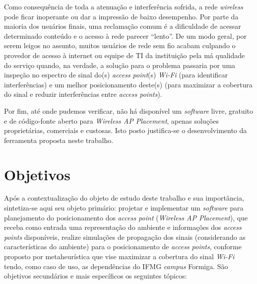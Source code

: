 \documentclass[
	12pt,				%
	twoside,			%
	a4paper,			%
	english,			%
	french,				%
	spanish,			%
	brazil				%
	]{abntex2}
\begin{document}
Como consequência de toda a atenuação e interferência sofrida, a rede
\emph{wireless} pode ficar inoperante ou dar a impressão de baixo
desempenho. Por parte da maioria dos usuários finais, uma reclamação
comum é a dificuldade de acessar determinado conteúdo e o acesso à rede
parecer ``lento''. De um modo geral, por serem leigos no assunto, muitos
usuários de rede sem fio acabam culpando o provedor de acesso à internet
ou equipe de TI da instituição pela má qualidade do serviço quando, na
verdade, a solução para o problema passaria por uma inspeção no espectro
de sinal do(s) \emph{access point}(s) \emph{Wi-Fi} (para identificar
interferências) e um melhor posicionamento deste(s) (para maximizar a
cobertura do sinal e reduzir interferências entre \emph{access points}).

Por fim, até onde pudemos verificar, não há disponível um
\emph{software} livre, gratuito e de código-fonte aberto para
\emph{Wireless AP Placement}, apenas soluções proprietárias, comerciais
e custosas. Isto posto justifica-se o desenvolvimento da ferramenta
proposta neste trabalho.

\section{Objetivos}\label{objetivos}

Após a contextualização do objeto de estudo deste trabalho e sua
importância, sintetiza-se aqui seu objeto primário: projetar e
implementar um \emph{software} para planejamento do posicionamento dos
\emph{access point} (\emph{Wireless AP Placement}), que receba como
entrada uma representação do ambiente e informações dos \emph{access
points} disponíveis, realize simulações de propagação dos sinais
(considerando as características do ambiente) para o posicionamento de
\emph{access points}, conforme proposto por metaheurística que vise
maximizar a cobertura do sinal \emph{Wi-Fi} tendo, como caso de uso, as
dependências do IFMG \emph{campus} Formiga. São objetivos secundários e
mais específicos os seguintes tópicos:
\end{document}

